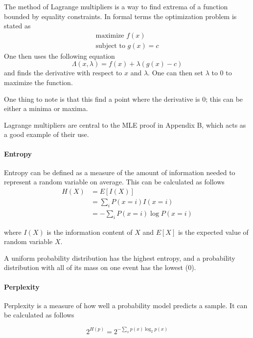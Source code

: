 \documentclass[11pt]{article}
\begin{document}
The method of Lagrange multipliers is a way to find extrema of a function bounded by equality constraints. In formal terms the optimization problem is stated as
\begin{gather*}
\text{maximize } f\left(x\right) \\
\text{subject to } g\left(x\right) = c
\end{gather*}
One then uses the following equation
$$ \Lambda\left(x, \lambda \right) = f\left(x\right) + \lambda\left(g\left(x\right) - c \right) $$
and finds the derivative with respect to $x$ and $\lambda$. One can then set $\lambda$ to 0 to maximize the function.

One thing to note is that this find a point where the derivative is 0; this can be either a minima or maxima. 

Lagrange multipliers are central to the MLE proof in Appendix B, which acts as a good example of their use.

\paragraph{Entropy}
Entropy can be defined as a measure of the amount of information needed to represent a random variable on average. This can be calculated as follows
\begin{align*}
H\left(X\right) &= E\left[I\left(X\right)\right] \\
&= \sum\limits_i P\left(x=i\right) I\left(x=i\right) \\
&= - \sum\limits_i P\left(x=i\right) \log P\left(x=i\right)
\end{align*}

where $I\left(X\right)$ is the information content of $X$ and $E\left[X\right]$ is the expected value of random variable $X$.

A uniform probability distribution has the highest entropy, and a probability distribution with all of its mass on one event has the lowest (0).

\paragraph{Perplexity}

Perplexity is a measure of how well a probability model predicts a sample. It can be calculated as follows

$$ 2^{H\left(p\right)} = 2^{-\sum_x p\left(x\right) \log_2 p\left(x\right)}$$
\end{document}
